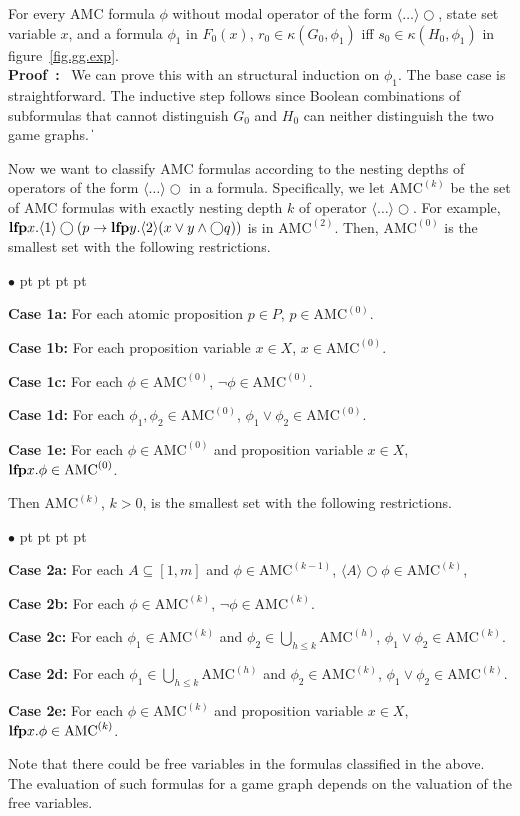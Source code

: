 \documentclass[11pt]{article}
\newcommand{\emlfp}{\mbox{\bf lfp}}
\newcommand{\pf}{\noindent\mbox{\bf Proof : }}
\newcommand{\nxt}{\bigcirc}
\def\qed{\ifmmode\|\else{\unskip\nobreak\hfil
\penalty50\hskip1em\null\nobreak\hfil$\blacksquare$
\parfillskip=0pt\finalhyphendemerits=0\endgraf}\fi}
\newenvironment{list1}{\begin{list}{$\bullet$}
{\topsep 0 pt \parsep 0 pt \partopsep 0 pt \itemsep 0 pt}}{\end{list}}
\begin{document}
{\lemma \label{lemma.amc.domain}
For every AMC formula $\phi$ without modal operator of the
form $\langle\ldots\rangle\nxt$, state set variable $x$, and
a formula $\phi_1$ in $F_0(x)$,
$r_0\in\kappa(G_0,\phi_1)$
iff
$s_0\in\kappa(H_0,\phi_1)$
in figure~\ref{fig.gg.exp}.
}
\\\pf 
We can prove this with an structural induction on $\phi_1$.
The base case is straightforward.
The inductive step follows since Boolean combinations of
subformulas that cannot distinguish $G_0$ and $H_0$ can neither
distinguish the two game graphs.
\qed





Now we want to classify AMC formulas according to the nesting depths of
operators of the form $\langle\ldots\rangle\nxt$ in a formula.
Specifically, we let $\mbox{AMC}^{(k)}$ be the set of AMC formulas
with exactly nesting depth $k$ of operator $\langle \ldots\rangle\nxt$.
For example,
$\emlfp x.\langle 1\rangle \nxt
(p\rightarrow \emlfp y.\langle 2\rangle (x\vee y\wedge\nxt q))$
is in $\mbox{AMC}^{(2)}$.
Then, $\mbox{AMC}^{(0)}$ is
the smallest set with the following restrictions.
\begin{list1}
\item {\bf Case 1a:} For each atomic proposition $p\in P$,
    $p\in \mbox{AMC}^{(0)}$.
\item {\bf Case 1b:} For each proposition variable $x\in X$,
    $x\in \mbox{AMC}^{(0)}$.
\item {\bf Case 1c:} For each $\phi\in \mbox{AMC}^{(0)}$,
    $\neg\phi\in \mbox{AMC}^{(0)}$.
\item {\bf Case 1d:} For each $\phi_1,\phi_2\in \mbox{AMC}^{(0)}$,
    $\phi_1\vee\phi_2\in \mbox{AMC}^{(0)}$.
\item {\bf Case 1e:} For each $\phi\in \mbox{AMC}^{(0)}$ and
    proposition variable $x\in X$,
    $\emlfp x.\phi\in \mbox{AMC}^{(0)}$.
\end{list1}
Then $\mbox{AMC}^{(k)}$, $k>0$,
is the smallest set with the following restrictions.
\begin{list1}
\item {\bf Case 2a:} For each $A\subseteq [1,m]$ and
    $\phi\in \mbox{AMC}^{(k-1)}$,
    $\langle A\rangle \nxt \phi\in \mbox{AMC}^{(k)}$,
\item {\bf Case 2b:} For each $\phi\in \mbox{AMC}^{(k)}$,
    $\neg\phi\in \mbox{AMC}^{(k)}$.
\item {\bf Case 2c:} For each $\phi_1\in \mbox{AMC}^{(k)}$ and
    $\phi_2\in\bigcup_{h\leq k}\mbox{AMC}^{(h)}$,
    $\phi_1\vee\phi_2\in \mbox{AMC}^{(k)}$.
\item {\bf Case 2d:} For each
    $\phi_1\in\bigcup_{h\leq k}\mbox{AMC}^{(h)}$ and $\phi_2\in \mbox{AMC}^{(k)}$,
    $\phi_1\vee\phi_2\in \mbox{AMC}^{(k)}$.
\item {\bf Case 2e:} For each $\phi\in \mbox{AMC}^{(k)}$ and
    proposition variable $x\in X$,
    $\emlfp x.\phi\in \mbox{AMC}^{(k)}$.
\end{list1}
Note that there could be free variables in the formulas classified in
the above.
The evaluation of such formulas for a game graph depends on the
valuation of the free variables.
\end{document}
